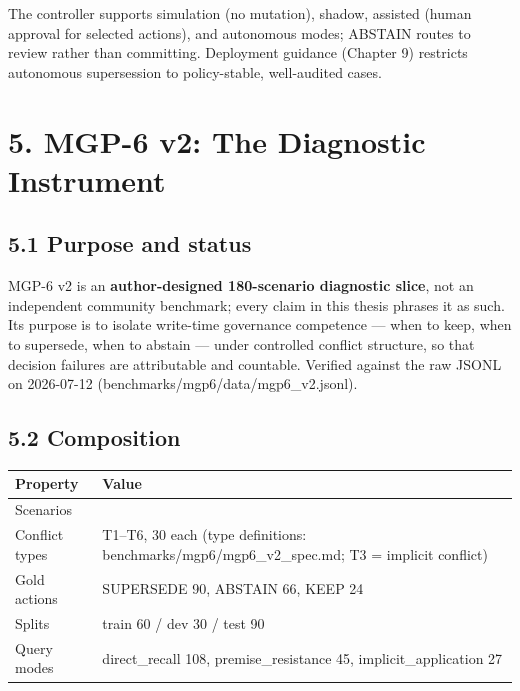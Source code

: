 The controller supports simulation (no mutation), shadow, assisted
(human approval for selected actions), and autonomous modes; ABSTAIN
routes to review rather than committing. Deployment guidance (Chapter 9)
restricts autonomous supersession to policy-stable, well-audited cases.

\section{5. MGP-6 v2: The Diagnostic
Instrument}\label{mgp-6-v2-the-diagnostic-instrument}

\subsection{5.1 Purpose and status}\label{purpose-and-status}

MGP-6 v2 is an \textbf{author-designed 180-scenario diagnostic slice},
not an independent community benchmark; every claim in this thesis
phrases it as such. Its purpose is to isolate write-time governance
competence --- when to keep, when to supersede, when to abstain ---
under controlled conflict structure, so that decision failures are
attributable and countable. Verified against the raw JSONL on 2026-07-12
(benchmarks/mgp6/data/mgp6\_v2.jsonl).

\subsection{5.2 Composition}\label{composition}

{\def\LTcaptype{none} %
\begin{longtable}[]{@{}
  >{\raggedright\arraybackslash}p{}
  >{\centering\arraybackslash}p{}@{}}
\toprule\noalign{}
\begin{minipage}[b]{\linewidth}\raggedright
\textbf{Property}
\end{minipage} & \begin{minipage}[b]{\linewidth}\centering
\textbf{Value}
\end{minipage} \\
\midrule\noalign{}
\endhead
\bottomrule\noalign{}
\endlastfoot
Scenarios & 180 \\
Conflict types & T1--T6, 30 each (type definitions:
benchmarks/mgp6/mgp6\_v2\_spec.md; T3 = implicit conflict) \\
Gold actions & SUPERSEDE 90, ABSTAIN 66, KEEP 24 \\
Splits & train 60 / dev 30 / test 90 \\
Query modes & direct\_recall 108, premise\_resistance 45,
implicit\_application 27 \\
\end{longtable}
}

